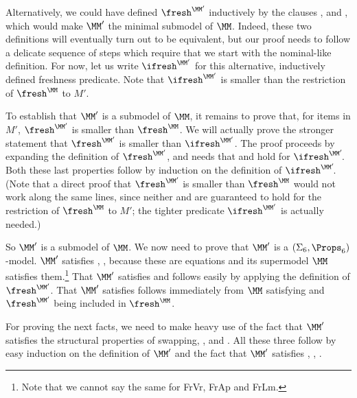 		Alternatively, we could have defined $\fresh^{\MM'}$ inductively by the clauses \FrVr{}, \FrAp{} and \FrLm{}, which would make $\MM'$ the minimal submodel of $\MM$. Indeed, these two definitions will eventually turn out to be equivalent, but our proof needs to follow a delicate sequence of steps which require that we start with the nominal-like definition. For now, let us write $\ifresh^{\MM'}$ for this alternative, inductively defined freshness predicate.  Note that $\ifresh^{\MM'}$ is smaller than the restriction of $\fresh^{\MM}$ to $M'$. 
		
		To establish that $\MM'$ is a submodel of $\MM$, it remains to prove that, for items in $M'$, $\fresh^{\MM'}$ is smaller than $\fresh^{\MM}$. We will actually prove the stronger statement that $\fresh^{\MM'}$ is smaller than $\ifresh^{\MM'}$. The proof proceeds by expanding the definition of $\fresh^{\MM'}$, and needs that \FrDSw{} and \FrSw{} hold for 
		$\ifresh^{\MM'}\!$.  Both these last properties follow by induction on the definition of $\ifresh^{\MM'}\!$. (Note that a direct proof that $\fresh^{\MM'}$ is smaller than $\fresh^{\MM}$ would not work along the same lines, since neither \FrDSw{} and \FrSw{}  are guaranteed to hold for the restriction of $\fresh^{\MM}$ to $M'$; the tighter predicate $\ifresh^{\MM'}$ is actually needed.)
		
		So $\MM'$ is a submodel of $\MM$. We now need to prove that 
		$\MM'$ is a $(\Sigma_6,\Props_6)$-model. 
		$\MM'$ satisfies \SwVr{}, \SwAp{}, \SwLm{} because these are equations and its supermodel $\MM$ satisfies them.\footnote{Note that 
		we cannot say the same for \textsf{FrVr}, \textsf{FrAp} and \textsf{FrLm}.}
		That $\MM'$ satisfies \FrVr{} and \FrAp{} follows easily by applying the definition of $\fresh^{\MM'}$. 
		That $\MM'$ satisfies \SwCg{} follows immediately from $\MM$ satisfying \SwCg{}  and $\fresh^{\MM'}$ being included in $\fresh^{\MM}$. 
		
		For proving the next facts, we need to make heavy use of the fact that $\MM'$ satisfies the structural properties of swapping, \SwId{}, \SwIv{} and \SwCp{}. 
		All these three follow by easy induction on the definition of $\MM'$ and the fact that $\MM'$ satisfies \SwVr{}, \SwAp{}, \SwLm{}. 
		
